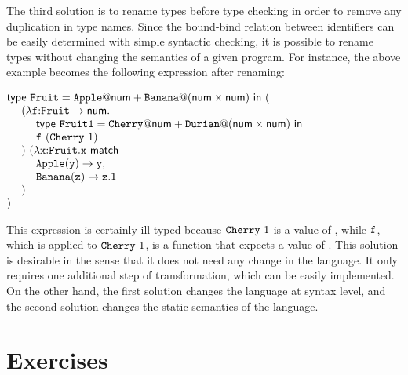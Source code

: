 The third solution is to rename types before type checking in order to remove
any duplication in type names. Since the bound-bind relation between identifiers
can be easily determined with simple syntactic checking, it is possible to
rename types without changing the semantics of a given program. For instance,
the above example becomes the following expression after renaming:

\vspace{0.5em}
$\begin{array}{@{}l}
  \etdef{\code{Fruit}}{\code{Apple}}{\tnum}{\code{Banana}}{(\tnum\times\tnum)}{( \\
  \ \ \ \ (\efunt{\cf}{\tarrow{\code{Fruit}}{\tnum}}{ \\
  \ \ \ \ \ \ \ \ \etdef{\code{Fruit1}}{\code{Cherry}}{\tnum}{\code{Durian}}{(\tnum\times\tnum)}{ \\
  \ \ \ \ \ \ \ \ \cf\ (\code{Cherry}\ 1)} \\
  \ \ \ \ })\ (\efunt{\cx}{\code{Fruit}}{\ematch{\cx}{ \\
  \ \ \ \ \ \ \ \ \code{Apple}}{\cy}{\cy}{ \\
  \ \ \ \ \ \ \ \ \code{Banana}}{\cz}{\cz\textsf{.1}}} \\
  \ \ \ \ ) \\
  )}
\end{array}$
\vspace{0.5em}

This expression is certainly ill-typed because $\texttt{Cherry}\ 1$ is a value of
, while $\texttt{f}$, which is applied to $\texttt{Cherry}\ 1$, is a
function that expects a value of .
This solution is desirable in the sense that it does not need any change in the
language. It only requires one additional step of transformation, which can be
easily implemented. On the other hand, the first solution changes the language
at syntax level, and the second solution changes the static semantics of the
language.

\section{Exercises}

